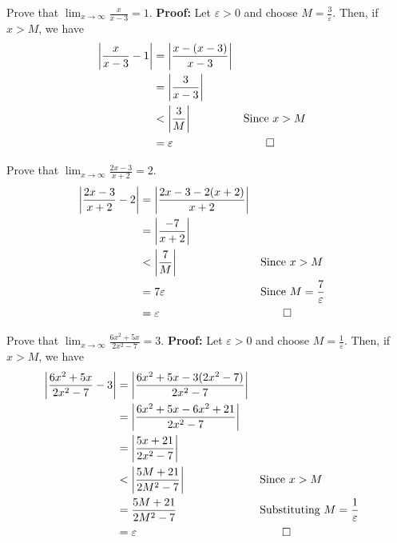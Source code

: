 \documentclass[11pt,oneside]{book}
\renewcommand{\epsilon}{\varepsilon}
\begin{document}
\begin{exercise}
  Prove that $\lim_{x \to \infty} \frac{x}{x-3} = 1$. \newline
  \textbf{Proof: } Let $\epsilon > 0$ and choose $M = \frac{3}{\epsilon}$. Then, if $x > M$, we have 
  \begin{align*}
    \left| \frac{x}{x-3} - 1 \right|
    &= \left| \frac{x - (x-3)}{x-3} \right| \\
    &= \left| \frac{3}{x-3} \right| \\
    &< \left| \frac{3}{M} \right| && \text{Since } x > M \\
    &= \epsilon && \qed
  \end{align*}
\end{exercise}


\begin{exercise}
  Prove that $\lim_{x \to \infty} \frac{2x-3}{x+2} = 2$. \newline
  \begin{align*}
    \left| \frac{2x-3}{x+2} - 2 \right|
    &= \left| \frac{2x-3 - 2(x+2)}{x+2} \right| \\
    &= \left| \frac{-7}{x+2} \right| \\
    &< \left| \frac{7}{M} \right| && \text{Since } x > M \\
    &= 7\epsilon && \text{Since } M = \frac{7}{\epsilon} \\
    &= \epsilon && \qed
  \end{align*}
\end{exercise}


\begin{exercise}
  Prove that $\lim_{x \to \infty} \frac{6x^{2}+5x}{2x^{2}-7} = 3$. \newline
  \textbf{Proof: } Let $\epsilon > 0$ and choose $M = \frac{1}{\epsilon}$. Then, if $x > M$, we have 
  \begin{align*}
    \left| \frac{6x^{2}+5x}{2x^{2}-7} - 3 \right|
    &= \left| \frac{6x^{2}+5x - 3(2x^{2}-7)}{2x^{2}-7} \right| \\
    &= \left| \frac{6x^{2}+5x - 6x^{2} + 21}{2x^{2}-7} \right| \\
    &= \left| \frac{5x + 21}{2x^{2}-7} \right| \\
    &< \left| \frac{5M + 21}{2M^{2}-7} \right| && \text{Since } x > M \\
    &= \frac{5M + 21}{2M^{2}-7} && \text{Substituting } M = \frac{1}{\epsilon} \\
    &= \epsilon && \qed
  \end{align*}
\end{exercise}
\end{document}
